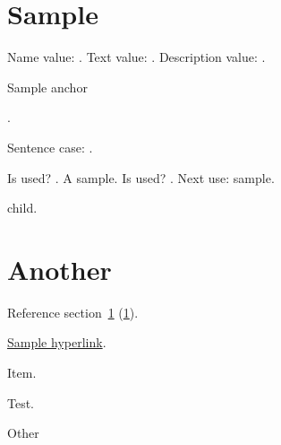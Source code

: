 \documentclass{article}
\begin{document}
\tableofcontents

\section{Sample}
\label{sec:sample}
Name value: .
Text value: .
Description value: .

\hypertarget{sampleanchor}{Sample anchor}.

Sentence case: .

Is used? .
A \gls{sample}.
Is used? .
Next use: \gls{sample}.

\Gls{child}.

\section{Another}
\label{sec:another}

Reference section~\ref{sec:sample} (\ref*{sec:sample}).

\hyperlink{sampleanchor}{Sample hyperlink}.

%

\begin{theglossary}
\item Item.
\end{theglossary}
Test.

Other
\end{document}
